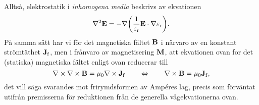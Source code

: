 Allts{\aa}, elektrostatik i {\it inhomogena media} beskrivs av ekvationen
$$
  \nabla^2{\bf E}=-\nabla\bigg(
      {{1}\over{\varepsilon_{\rm r}}}{\bf E}\cdot\nabla\varepsilon_{\rm r}
    \bigg).
$$
\bigskip
{}
\smallskip
\noindent
P{\aa} samma s{\"a}tt har vi f{\"o}r det magnetiska f{\"a}ltet ${\bf B}$ i
n{\"a}rvaro av en konstant str{\"o}mt{\"a}thet ${\bf J}_{\rm f}$, men i
fr{\aa}nvaro av magnetisering ${\bf M}$, att ekvationen ovan for det (statiska)
magnetiska f{\"a}ltet enligt ovan reducerar till
$$
  \nabla\times\nabla\times{\bf B}=\mu_0\nabla\times{\bf J}_{\rm f}
  \qquad\Leftrightarrow\qquad
  \nabla\times{\bf B}=\mu_0{\bf J}_{\rm f},
$$
det vill s{\"a}ga svarandes mot frirymdsformen av Amp\'eres lag, precis som
f{\"o}rv{\"a}ntat utifr{\aa}n premisserna f{\"o}r reduktionen fr{\aa}n de
generella v{\aa}gekvationerna ovan.
\bye
